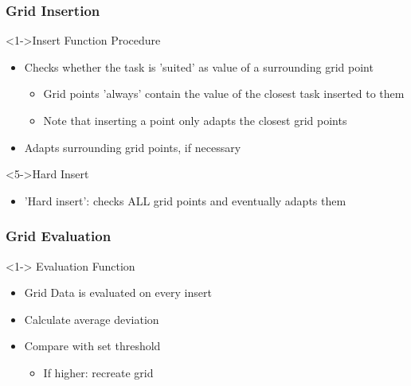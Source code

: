\begin{frame}
	\frametitle{Grid Insertion}
	
		\begin{block}<1->{Insert Function Procedure}
			\begin{itemize}
				\item<2->{Checks whether the task is 'suited' as value of a 									surrounding grid point}
				\begin{itemize}
					\item<3->{Grid points 'always' contain the value of the 									closest task inserted to them}
					\item<4->{Note that inserting a point only adapts the 										closest grid points}
				\end{itemize}
				\item<5->{Adapts surrounding grid points, if necessary}
			\end{itemize}
		\end{block}
		
		\begin{block}<5->{Hard Insert}
			\begin{itemize}
				\item{'Hard insert': checks ALL grid points and eventually 								adapts them}
			\end{itemize}	
		\end{block}
\end{frame}

\begin{frame}
	\frametitle{Grid Evaluation}
	
	\begin{block}<1-> {Evaluation Function}
		\begin{itemize}
			\item<2-> {Grid Data is evaluated on every insert}
			\item<3-> {Calculate average deviation}
			\item<4-> {Compare with set threshold}
			\begin{itemize}
				\item<5->{If higher: recreate grid}
			\end{itemize}
		\end{itemize}
	\end{block}
\end{frame}	
	
	
	
